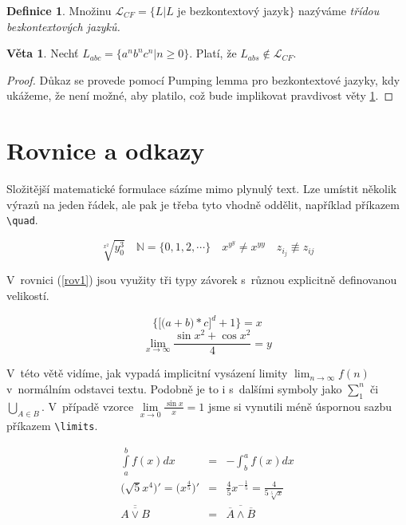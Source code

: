 \documentclass[11pt,a4paper,twocolumn]{article}
\theoremstyle{definition}
\newtheorem{defn}{Definice}[section]
\theoremstyle{lemma}
\newtheorem{sntc}{Věta}
\begin{document}
\begin{defn} 
  \label{defn4}
  Množinu $\mathcal{L}_{CF}=\{L|L$ je bezkontextový jazyk$\}$ nazýváme {\itshape třídou bezkontextových jazyků.}
\end{defn}

\begin{sntc}
  \label{sntc1}
  Nechť $L_{abc}=\{a^nb^nc^n|n\geq 0\}$. Platí, že $L_{abs}\notin \mathcal{L}_{CF}$.
\end{sntc}

\begin{proof} 
  \label{proof}
  Důkaz se provede pomocí Pumping lemma pro bezkontextové jazyky, kdy ukážeme, že není možné, aby
  platilo, což bude implikovat pravdivost věty \ref{sntc1}.
\end{proof}

\section{Rovnice a odkazy}
\label{rovniceaodkazy}

\noindent Složitější matematické formulace sázíme mimo plynulý text. Lze umístit několik výrazů
na jeden řádek, ale pak je třeba tyto vhodně oddělit, například příkazem \verb|\quad|.

$$\sqrt[x^2]{y^3_0} \quad \mathbb{N} =\{0, 1, 2,\cdots\}\quad x^{y^y} \not =x^{yy} \quad z_{i_j}
\not\equiv z_{ij}$$

\indent V~rovnici (\ref{rov1}) jsou využity tři typy závorek s~různou explicitně definovanou velikostí.

\begin{equation}\label{rov1}
 \bigg\{\Big[\big(a+b\big)*c\Big]^d+1\bigg\}=x 
\end{equation}
$$\lim_{x\to \infty} \frac{\sin{x}^2+\cos{x}^2}{4} = y$$

\indent V~této větě vidíme, jak vypadá implicitní vysázení limity $\lim_{n\to \infty}f(n)$
v~normálním odstavci textu. Podobně je to i s~dalšími symboly jako $\sum_1^n$ či
$\bigcup_{A\in B}$. V~případě vzorce $\lim\limits _{x\to 0} \frac{\sin{x}}{x}\!=\!1$ jsme si vynutili méně úspornou
sazbu příkazem \verb|\limits|.

\begin{eqnarray}
  \int\limits_{a}^{b} f(x)dx & = & -\int_b^a f(x)dx \\
  \Big(\sqrt{5}{x^4}\Big)' = \Big(x^\frac{4}{5}\Big)' & = & \frac{4}{5}x^{-\frac{1}{5}} =
  \frac{4}{5\sqrt[5]{x}} \\
  \overline{\overline{A \lor B}} & = & \overline{\overline{A}\land\overline{B}}
\end{eqnarray}
\end{document}
